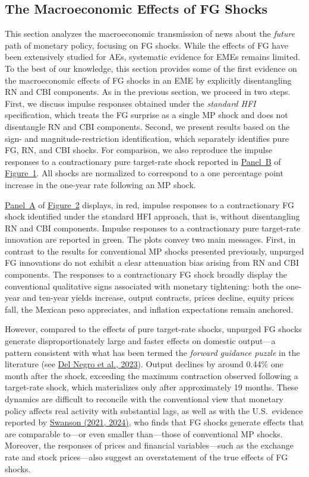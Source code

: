 \documentclass[\latexroot/\projectname]{subfiles}
\begin{document}
\subsection{The Macroeconomic Effects of FG Shocks}

This section analyzes the macroeconomic transmission of news about the \emph{future} path of monetary policy, focusing on FG shocks. While the effects of FG have been extensively studied for AEs, systematic evidence for EMEs remains limited. To the best of our knowledge, this section provides some of the first evidence on the macroeconomic effects of FG shocks in an EME by explicitly disentangling RN and CBI components. As in the previous section, we proceed in two steps. First, we discuss impulse responses obtained under the \emph{standard HFI} specification, which treats the FG surprise as a single MP shock and does not disentangle RN and CBI components. Second, we present results based on the sign- and magnitude-restriction identification, which separately identifies pure FG, RN, and CBI shocks. For comparison, we also reproduce the impulse responses to a contractionary pure target-rate shock reported in \hyperlink{Panel BF1}{Panel~B} of \hyperlink{Figure~1}{Figure~1}. All shocks are normalized to correspond to a one percentage point increase in the one-year rate following an MP shock.

\hyperlink{Panel BF1}{Panel~A} of \hyperlink{Figure~2}{Figure~2} displays, in red, impulse responses to a contractionary FG shock identified under the standard HFI approach, that is, without disentangling RN and CBI components. Impulse responses to a contractionary pure target-rate innovation are reported in green. The plots convey two main messages. First, in contrast to the results for conventional MP shocks presented previously, unpurged FG innovations do not exhibit a clear attenuation bias arising from RN and CBI components. The responses to a contractionary FG shock broadly display the conventional qualitative signs associated with monetary tightening: both the one-year and ten-year yields increase, output contracts, prices decline, equity prices fall, the Mexican peso appreciates, and inflation expectations remain anchored. 

However, compared to the effects of pure target-rate shocks, unpurged FG shocks generate disproportionately large and faster effects on domestic output—a pattern consistent with what has been termed the \emph{forward guidance puzzle} in the literature (see \hyperlink{Del Negro et al. (2023)}{Del Negro et al., 2023}). Output declines by around 0.44\% one month after the shock, exceeding the maximum contraction observed following a target-rate shock, which materializes only after approximately 19 months. These dynamics are difficult to reconcile with the conventional view that monetary policy affects real activity with substantial lags, as well as with the U.S.\ evidence reported by \hyperlink{Swanson (2021, 2024)}{Swanson (2021, 2024)}, who finds that FG shocks generate effects that are comparable to—or even smaller than—those of conventional MP shocks. Moreover, the responses of prices and financial variables—such as the exchange rate and stock prices—also suggest an overstatement of the true effects of FG shocks.
\end{document}
